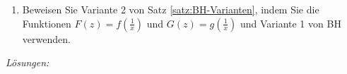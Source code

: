 \begin{ueb}
\begin{enumerate}
\begin{displaymath}
\begin{array}{lll}
				      \mbox{\bf (h)}\;\; \lim\limits_{x\rightarrow 0} \, \frac{\arcsin (x)}{x}                                     &
				      \mbox{\bf (i)} \;\; \lim\limits_{x\rightarrow 0^+} \, \Big( \cot (x) \Big) ^{\tan (x)}                             \\
				                                                                                                                   &   & \\
				      \mbox{\bf (j)} \;\;\lim\limits_{x\rightarrow 0} \, \frac{x^\alpha}{e^x} \, , \hspace{0.3cm} x,\alpha >0      &
				      \mbox{\bf (k)} \;\;\lim\limits_{x\rightarrow \infty} \, \frac{x^\alpha}{e^x} \, , \hspace{0.3cm} x,\alpha >0 &
				      \mbox{\bf (l)} \lim\limits_{x\rightarrow 0} \, \frac{e^x-e^{-x}-2x}{x-\sin (x)}
			      \end{array}
		      \end{displaymath}
		\item Beweisen Sie Variante 2 von Satz \ref*{satz:BH-Varianten}, indem Sie die Funktionen $F(z)=f(\frac{1}{x})$ und $G(z)=g(\frac{1}{x})$ und Variante 1 von BH verwenden.
	\end{enumerate}
\end{ueb}

\emph{Lösungen:}

